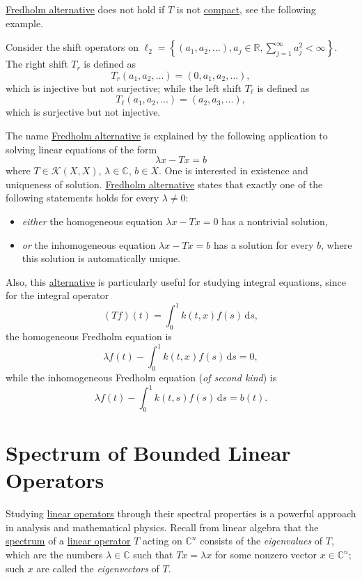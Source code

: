 \hyperref[thm:Fredholm-alternative]{Fredholm alternative} does not hold if \(T\) is not \hyperref[def:compact-op]{compact}, see the following example.
\begin{eg}
	Consider the shift operators on \(\ell _2 = \left\{ (a_1, a_2, \ldots ), a_j\in \mathbb{R}, \sum_{j=1}^{\infty}  a_j^2 < \infty \right\} \). The right shift \(T_r\) is defined as
	\[
		T_r(a_1, a_2, \ldots) = (0, a_1, a_2, \ldots ),
	\]
	which is injective but not surjective; while the left shift \(T_{\ell} \) is defined as
	\[
		T_{\ell } (a_1, a_2, \ldots ) = (a_2, a_3, \ldots ),
	\]
	which is surjective but not injective.
\end{eg}

The name \hyperref[thm:Fredholm-alternative]{Fredholm alternative} is explained by the following application to solving linear equations of the form
\[
	\lambda x - Tx = b
\]
where \(T\in \mathcal{K} (X, X)\), \(\lambda \in \mathbb{C} \), \(b\in X\). One is interested in existence and uniqueness of solution. \hyperref[thm:Fredholm-alternative]{Fredholm alternative} states that exactly one of the following statements holds for every \(\lambda \neq 0\):
\begin{itemize}
	\item \emph{either} the homogeneous equation \(\lambda x - Tx = 0\) has a nontrivial solution,
	\item \emph{or} the inhomogeneous equation \(\lambda x - Tx = b\) has a solution for every \(b\), where this solution is automatically unique.
\end{itemize}

Also, this \hyperref[thm:Fredholm-alternative]{alternative} is particularly useful for studying integral equations, since for the integral operator
\[
	(Tf)(t) = \int_{0}^{1} k(t, x)f(s) \,\mathrm{d}s ,
\]
the homogeneous Fredholm equation is
\[
	\lambda f(t) - \int_{0}^{1} k(t, x)f(s) \,\mathrm{d}s = 0,
\]
while the inhomogeneous Fredholm equation (\emph{of second kind}) is
\[
	\lambda f(t) - \int_{0}^{1} k(t, s) f(s) \,\mathrm{d}s = b(t).
\]

\section{Spectrum of Bounded Linear Operators}
Studying \hyperref[def:linear-op]{linear operators} through their spectral properties is a powerful approach in analysis and mathematical physics. Recall from linear algebra that the \hyperref[def:spectrum-point]{spectrum} of a \hyperref[def:linear-op]{linear operator} \(T\) acting on \(\mathbb{C} ^n\) consists of the \emph{eigenvalues} of \(T\), which are the numbers \(\lambda \in \mathbb{C} \) such that \(Tx = \lambda x\) for some nonzero vector \(x\in \mathbb{C} ^n\); such \(x\) are called the \emph{eigenvectors} of \(T\).

